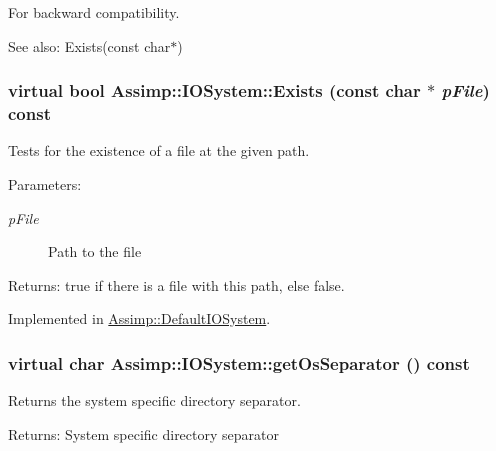 For backward compatibility. 

\begin{Desc}
\item[See also:]Exists(const char$\ast$) \end{Desc}
\hypertarget{class_assimp_1_1_i_o_system_79f5fe8d2dbe1056c9418f7de9a72445}{
\subsubsection[Exists]{\setlength{\rightskip}{0pt plus 5cm}virtual bool Assimp::IOSystem::Exists (const char $\ast$ {\em pFile}) const}}
\label{class_assimp_1_1_i_o_system_79f5fe8d2dbe1056c9418f7de9a72445}


Tests for the existence of a file at the given path. 

\begin{Desc}
\item[Parameters:]
\begin{description}
\item[{\em pFile}]Path to the file \end{description}
\end{Desc}
\begin{Desc}
\item[Returns:]true if there is a file with this path, else false. \end{Desc}


Implemented in \hyperlink{class_assimp_1_1_default_i_o_system_f8b310025faaed12c6d65c586e935255}{Assimp::DefaultIOSystem}.\hypertarget{class_assimp_1_1_i_o_system_40e412875b985bdb638f00ef0f20fff6}{
\subsubsection[getOsSeparator]{\setlength{\rightskip}{0pt plus 5cm}virtual char Assimp::IOSystem::getOsSeparator () const}}
\label{class_assimp_1_1_i_o_system_40e412875b985bdb638f00ef0f20fff6}


Returns the system specific directory separator. 

\begin{Desc}
\item[Returns:]System specific directory separator \end{Desc}


